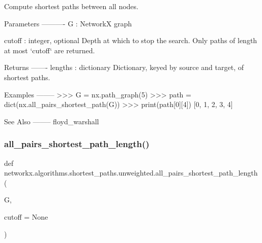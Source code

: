 \begin{DoxyVerb}Compute shortest paths between all nodes.

Parameters
----------
G : NetworkX graph

cutoff : integer, optional
    Depth at which to stop the search. Only paths of length at most
    `cutoff` are returned.

Returns
-------
lengths : dictionary
    Dictionary, keyed by source and target, of shortest paths.

Examples
--------
>>> G = nx.path_graph(5)
>>> path = dict(nx.all_pairs_shortest_path(G))
>>> print(path[0][4])
[0, 1, 2, 3, 4]

See Also
--------
floyd_warshall\end{DoxyVerb}
 \mbox{\label{namespacenetworkx_1_1algorithms_1_1shortest__paths_1_1unweighted_ac9260ea54a81be0a03461317aa4622be}} 
\subsubsection{\texorpdfstring{all\+\_\+pairs\+\_\+shortest\+\_\+path\+\_\+length()}{all\_pairs\_shortest\_path\_length()}}
{\footnotesize\ttfamily def networkx.\+algorithms.\+shortest\+\_\+paths.\+unweighted.\+all\+\_\+pairs\+\_\+shortest\+\_\+path\+\_\+length (\begin{DoxyParamCaption}\item[{}]{G,  }\item[{}]{cutoff = {\ttfamily None} }\end{DoxyParamCaption})}

